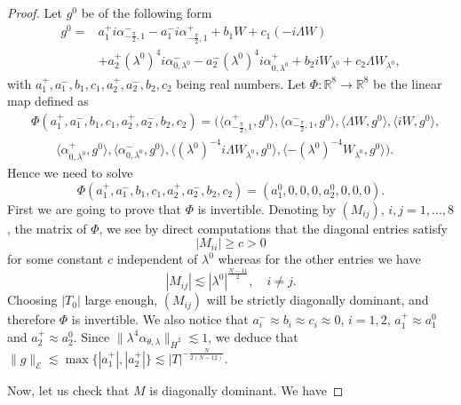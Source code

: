 \documentclass[a4paper,two-side,10pt]{amsart}
\newcommand{\R}{\mathbb{R}}
\numberwithin{equation}{section}
\begin{document}
\begin{proof}
Let $g^0$ be of the following form
\begin{align*}
g^0 = & a_1^+ i \alpha^-_{-\frac{\pi}{2},1} - a_1^- i \alpha^+_{-\frac{\pi}{2}, 1}+b_1 W +c_1 (-i \Lambda W)\\
& +a_2^+ (\lambda^0)^4 i \alpha_{0,\lambda^0}^- -a_2^- (\lambda^0)^4 i \alpha_{0,\lambda^0}^+ + b_2 i W_{\lambda^0} +c_2 \Lambda W_{\lambda^0}, 
\end{align*}
with $a_1^+ ,a_1^- , b_1 ,c_1 ,a_2^+ ,a_2^- , b_2 ,c_2$ being real numbers. Let $\Phi : \R^8 \rightarrow \R^8$ be the linear map defined as
\begin{align*}
&\Phi (a_1^+ , a_1^- , b_1 ,c_1 ,a_2^+ ,a_2^- , b_2 ,c_2) = \big(\langle \alpha^+_{-\frac{\pi}{2},1}, g^0 \rangle , \langle \alpha^-_{-\frac{\pi}{2},1}, g^0 \rangle , \langle \Lambda W , g^0 \rangle , \langle iW ,g^0 \rangle, \\
&\qquad \langle \alpha^+_{0,\lambda^0} , g^0 \rangle , \langle \alpha_{0,\lambda^0}^- , g^0 \rangle , \langle (\lambda^0)^{-4} i \Lambda W_{\lambda^0}, g^0 \rangle , \langle - (\lambda^0)^{-4} W_{\lambda^0} , g^0 \rangle \big).
\end{align*}
Hence we need to solve
\[
\Phi (a_1^+ , a_1^- , b_1 ,c_1 ,a_2^+ ,a_2^- , b_2 ,c_2) = (a_1^0 ,0 , 0,0,a_2^0 ,0 ,0,0).
\]
First we are going to prove that $\Phi$ is invertible.
Denoting by $(M_{ij})$, $i,j=1,\ldots ,8$, the matrix of $\Phi$, we see by direct computations that the diagonal entries satisfy
\[
|M_{ii}|\ge c>0
\]
for some constant $c$ independent of $\lambda^0$ whereas for the other entries we have
\[
|M_{ij}| \lesssim |\lambda^0|^{\frac{N-11}{2}},\quad i\ne j.
\]
Choosing $|T_0|$ large enough, $(M_{ij})$ will be strictly diagonally dominant, and therefore $\Phi$ is invertible. We also notice that $a_i^- \approx b_i \approx c_i \approx 0 $, $i=1,2$, $a_1^+ \approx a_1^0$ and $a_2^+ \approx a_2^0$. Since $\|\lambda^4 \alpha_{\theta , \lambda}\|_{\dot{H}^2} \lesssim 1$, we deduce that $\|g\|_{\mathcal{E}} \lesssim \max \{|a_1^+|, |a_2^+|\} \lesssim |T|^{-\frac{N}{2(N-12)}}$.   

\iffalse
Now, let us check that $M$ is diagonally dominant. We have




\end{proof}
\end{document}
